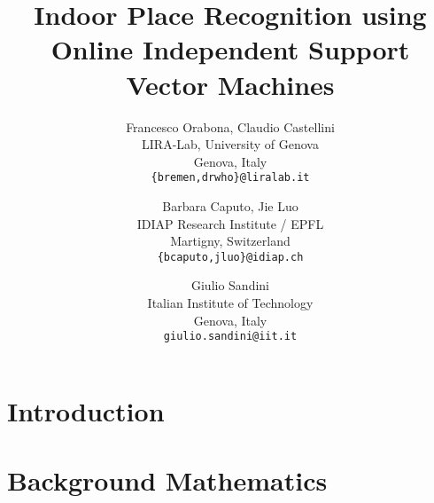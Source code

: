\documentclass{bmvc}
\begin{document}

\title{Indoor Place Recognition using Online Independent Support Vector Machines}

\author{
Francesco Orabona, Claudio Castellini\\
LIRA-Lab, University of Genova\\
Genova, Italy\\
{\tt\small \{bremen,drwho\}@liralab.it}
\and
Barbara Caputo, Jie Luo\\
IDIAP Research Institute / EPFL\\
Martigny, Switzerland\\
{\tt\small \{bcaputo,jluo\}@idiap.ch}
\and
Giulio Sandini\\
Italian Institute of Technology\\
Genova, Italy\\
{\tt\small giulio.sandini@iit.it}
}


\maketitle


\begin{abstract}
  
\end{abstract}

\section{Introduction}
\label{introduction}


%

\section{Background Mathematics}
\label{sec:bg}

\end{document}
